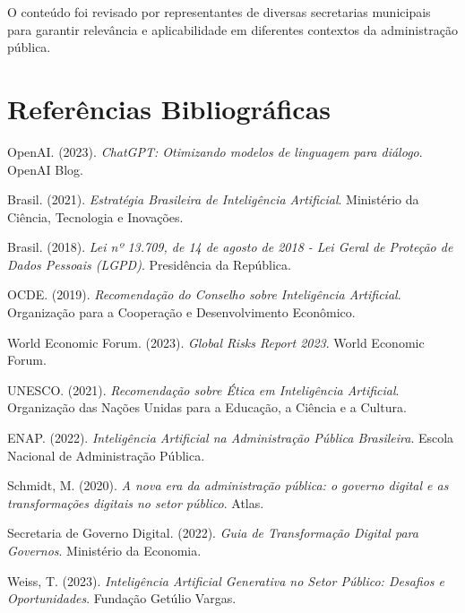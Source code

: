 \documentclass[12pt,a4paper]{book}
\begin{document}
O conteúdo foi revisado por representantes de diversas secretarias municipais para garantir relevância e aplicabilidade em diferentes contextos da administração pública.

\chapter*{Referências Bibliográficas}

\begin{thebibliography}{99}

 OpenAI. (2023). \textit{ChatGPT: Otimizando modelos de linguagem para diálogo}. OpenAI Blog.

 Brasil. (2021). \textit{Estratégia Brasileira de Inteligência Artificial}. Ministério da Ciência, Tecnologia e Inovações.

 Brasil. (2018). \textit{Lei nº 13.709, de 14 de agosto de 2018 - Lei Geral de Proteção de Dados Pessoais (LGPD)}. Presidência da República.

 OCDE. (2019). \textit{Recomendação do Conselho sobre Inteligência Artificial}. Organização para a Cooperação e Desenvolvimento Econômico.

 World Economic Forum. (2023). \textit{Global Risks Report 2023}. World Economic Forum.

 UNESCO. (2021). \textit{Recomendação sobre Ética em Inteligência Artificial}. Organização das Nações Unidas para a Educação, a Ciência e a Cultura.

 ENAP. (2022). \textit{Inteligência Artificial na Administração Pública Brasileira}. Escola Nacional de Administração Pública.

 Schmidt, M. (2020). \textit{A nova era da administração pública: o governo digital e as transformações digitais no setor público}. Atlas.

 Secretaria de Governo Digital. (2022). \textit{Guia de Transformação Digital para Governos}. Ministério da Economia.

 Weiss, T. (2023). \textit{Inteligência Artificial Generativa no Setor Público: Desafios e Oportunidades}. Fundação Getúlio Vargas.

\end{thebibliography}
\end{document}
